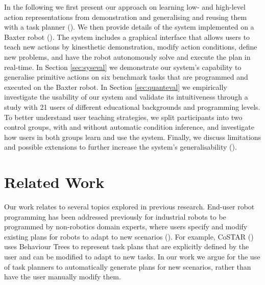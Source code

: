 In the following we first present our approach on learning low- and high-level action representations from demonstration and generalising and reusing them with a task planner ().
We then provide details of the system implemented on a Baxter robot (). 
The system includes a graphical interface that allows users to teach new actions by kinesthetic demonstration, modify action conditions, define new problems, and have the robot autonomously solve and execute the plan in real-time.
In Section \ref{sec:syseval} we demonstrate our system's capability to generalise primitive actions on six benchmark tasks that are programmed and executed on the Baxter robot.
In Section \ref{sec:quanteval} we empirically investigate the usability of our system and validate its intuitiveness through a study with 21 users of different educational backgrounds and programming levels.
To better understand user teaching strategies, we split participants into two control groups, with and without automatic condition inference, and investigate how users in both groups learn and use the system.
Finally, we discuss limitations and possible extensions to further increase the system's generalisability ().

\section{Related Work}
\label{sec:relatedwork}
Our work relates to several topics explored in previous research.
End-user robot programming has been addressed previously for industrial robots to be programmed by non-robotics domain experts, where users specify and modify existing plans for robots to adapt to new scenarios (\cite{paxton2017costar,perzylo2016intuitive,stenmark2017simplified}).
For example, CoSTAR (\citet{paxton2017costar}) uses Behaviour Trees to represent task plans that are explicitly defined by the user and can be modified to adapt to new tasks.
In our work we argue for the use of task planners to automatically generate plans for new scenarios, rather than have the user manually modify them.

